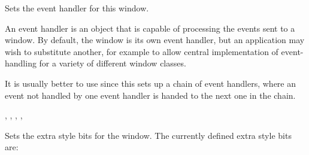 Sets the event handler for this window.




An event handler is an object that is capable of processing the events
sent to a window. By default, the window is its own event handler, but
an application may wish to substitute another, for example to allow
central implementation of event-handling for a variety of different
window classes.

It is usually better to use  since
this sets up a chain of event handlers, where an event not handled by one event handler is
handed to the next one in the chain.


,\rtfsp
{},\rtfsp
{},\rtfsp
{},\rtfsp
{}


\label{wxwindowsetextrastyle}


Sets the extra style bits for the window. The currently defined extra style
bits are:

